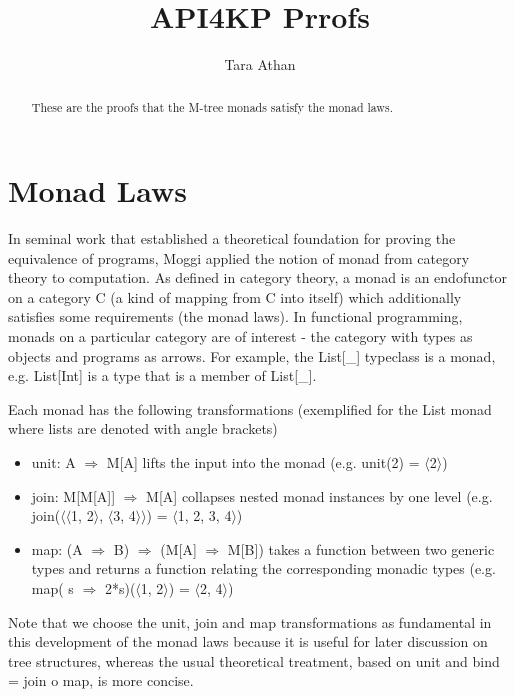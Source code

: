 \documentclass[runningheads]{llncs}
\title{API4KP Prrofs}
\date{}
\begin{document}
%
\author{Tara Athan}

%
\maketitle

\begin{abstract}
These are the proofs that the M-tree monads satisfy the monad laws.
\end{abstract}


\section{Monad Laws}
In seminal work that established a theoretical foundation for proving the equivalence of programs, Moggi\cite{moggi_notions_1991} applied the notion of monad from category theory\cite{MacLane1998} to computation.
As defined in category theory, a monad  is an endofunctor on a category C (a kind of mapping from C into itself) which additionally satisfies some requirements (the monad laws).
In functional programming, monads on a particular category are of interest - the category with types as objects and programs as arrows.
For example, the List[\_] typeclass is a monad, e.g. List[Int] is a type that is a member of List[\_].

Each monad has the following transformations (exemplified for the List monad where lists are denoted with angle brackets)
\begin{itemize}
\item unit: A $\Rightarrow$ M[A] lifts the input into the monad (e.g. unit(2) = $\langle$2$\rangle$)
\item join: M[M[A]] $\Rightarrow$ M[A] collapses nested monad instances by one level (e.g. join($\langle$$\langle$1, 2$\rangle$, $\langle$3, 4$\rangle$$\rangle$) = $\langle$1, 2, 3, 4$\rangle$)
\item map: (A $\Rightarrow$ B) $\Rightarrow$ (M[A] $\Rightarrow$ M[B]) takes a function between two generic types and returns a function relating the corresponding monadic types (e.g. map( s $\Rightarrow$ 2*s)($\langle$1, 2$\rangle$) = $\langle$2, 4$\rangle$)
\end{itemize}
Note that we choose the unit, join and map transformations\cite{Wadler1992} as fundamental in this development of the monad laws because it is useful for later discussion on tree structures, whereas the usual theoretical treatment, based on unit and bind = join o map, is more concise.
\end{document}
